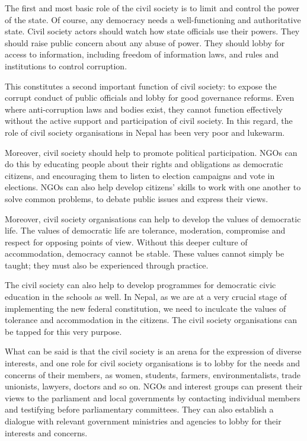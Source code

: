 \documentclass[
  openany]{book}
\begin{document}
\begin{questions}
The first and most basic role of the civil society is to limit and control the power of the state. Of course, any democracy needs a well-functioning and authoritative state. Civil society actors should watch how state officials use their powers. They should raise public concern about any abuse of power. They should lobby for access to information, including freedom of information laws, and rules and institutions to control corruption.            

This constitutes a second important function of civil society:  to expose the corrupt conduct of public officials and lobby for good governance reforms. Even where anti-corruption laws and bodies exist, they cannot function effectively without the active support and participation of civil society. In this regard, the role of civil society organisations in Nepal has been very poor and lukewarm.

Moreover, civil society should help to promote political participation. NGOs can do this by educating people about their rights and obligations as democratic citizens, and encouraging them to listen to election campaigns and vote in elections. NGOs can also help develop citizens' skills to work with one another to solve common problems, to debate public issues and express their views.

Moreover,  civil society organisations can help to develop the  values of democratic life. The values of democratic life are tolerance, moderation, compromise and respect for opposing points of view. Without this deeper culture of accommodation, democracy cannot be stable. These values cannot simply be taught; they must also be experienced through practice.

The civil society can also help to develop programmes for democratic civic education in the schools as well. In Nepal, as we are at a very crucial stage of implementing the new  federal constitution, we need to inculcate the values of tolerance and accommodation in the citizens. The civil society organisations can be tapped for this very purpose.

What can be said is that the  civil society is an arena for the expression of diverse interests, and one role for civil society organisations is to lobby for the needs and concerns of their members, as women, students, farmers, environmentalists, trade unionists, lawyers, doctors and so on. NGOs and interest groups can present their views to the parliament and local governments by contacting individual members and testifying before parliamentary committees. They can also establish a dialogue with relevant government ministries and agencies to lobby for their interests and concerns.


\end{questions}
\end{document}
